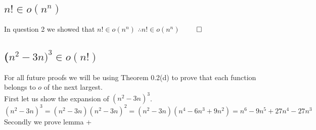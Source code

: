 \documentclass{article}
\begin{document}
      \subsection{$n! \in o(n^{n})$}
        In question 2 we showed that $n! \in o(n^{n})$
        $\therefore n! \in o(n^{n})$ $\qed$
        \subsection{($n^{2} - 3n)^{3} \in o(n!)$}
        For all future proofs we will be using Theorem 0.2(d) to prove that each function belongs to $o$ of the next largest. \\
        First let us show the expansion of $(n^{2} - 3n)^{3}$. \\
        $(n^{2} - 3n)^{3} = (n^{2} - 3n)(n^{2} - 3n)^{2} = (n^{2} - 3n)(n^{4} - 6n^{3} + 9n^{2}) = n^{6} - 9n^{5} + 27n^{4} - 27n^{3}$ \\
        Secondly we prove lemma +
\end{document}
